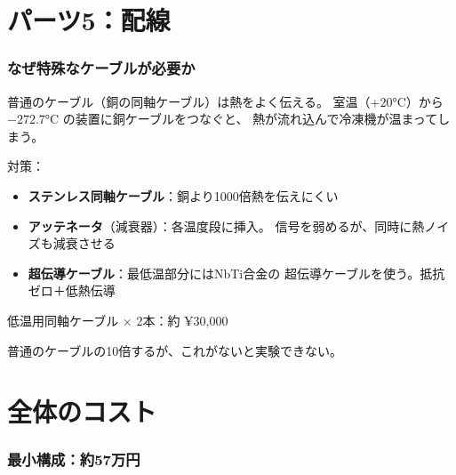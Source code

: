 \documentclass[12pt,a4paper]{article}
\begin{document}
\part{パーツ5：配線}

\section{なぜ特殊なケーブルが必要か}

\begin{naruhodox}[低温配線の問題]
普通のケーブル（銅の同軸ケーブル）は熱をよく伝える。
室温（$+20$°C）から $-272.7$°C の装置に銅ケーブルをつなぐと、
熱が流れ込んで冷凍機が温まってしまう。

対策：
\begin{itemize}
\item \textbf{ステンレス同軸ケーブル}：銅より1000倍熱を伝えにくい
\item \textbf{アッテネータ}（減衰器）：各温度段に挿入。
信号を弱めるが、同時に熱ノイズも減衰させる
\item \textbf{超伝導ケーブル}：最低温部分にはNbTi合金の
超伝導ケーブルを使う。抵抗ゼロ＋低熱伝導
\end{itemize}
\end{naruhodox}

\begin{kanenobox}[ケーブルのコスト]
低温用同軸ケーブル $\times$ 2本：約 ¥30,000

普通のケーブルの10倍するが、これがないと実験できない。
\end{kanenobox}

\part{全体のコスト}

\section{最小構成：約57万円}
\end{document}
